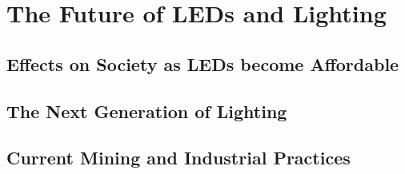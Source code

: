 
\section{The Future of LEDs and
Lighting}\label{the-future-of-leds-and-lighting}

\subsection{Effects on Society as LEDs become
Affordable}\label{effects-on-society-as-leds-become-affordable}

\subsection{The Next Generation of
Lighting}\label{the-next-generation-of-lighting}

\subsection{Current Mining and Industrial
Practices}\label{current-mining-and-industrial-practices}
